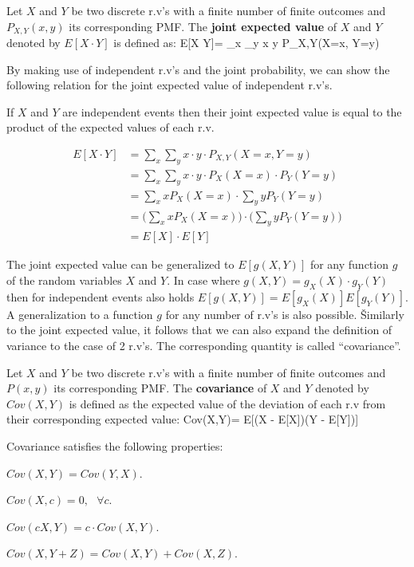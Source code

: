 Let $X$ and $Y$ be two discrete r.v's with a finite number of finite outcomes and $P_{X,Y}(x,y)$ its corresponding
PMF. The \textbf{joint expected value} of $X$ and $Y$ denoted by $E[X \cdot Y]$ is defined as:
\bse
E[X \cdot Y]= \sum _{x} \sum _{y} x \cdot y \cdot P_{X,Y}(X=x, Y=y)
\ese
\ed

By making use of independent r.v's and the joint probability, we can show the following relation for the joint
expected value of independent r.v's.

\bt[]
If $X$ and $Y$ are independent events then their joint expected value is equal to the product of the expected values
of each r.v.
\et

\bq
\begin{align*}
E[X \cdot Y] &= \sum _{x} \sum _{y} x \cdot y \cdot P_{X,Y}(X=x, Y=y) \\
&= \sum _{x} \sum _{y} x \cdot y \cdot P_{X}(X=x) \cdot P_{Y}(Y=y) \\
&= \sum _{x} x P_{X}(X=x) \cdot \sum _{y} y P_{Y}(Y=y) \\
&= \Big( \sum _{x} x P_{X}(X=x) \Big) \cdot \Big(\sum _{y} y P_{Y}(Y=y) \Big) \\
&= E[X] \cdot E[Y]
\end{align*}
\eq

The joint expected value can be generalized to $E[g(X,Y)]$ for any function $g$ of the random variables $X$ and $Y$.
In case where $g(X,Y) = g_{X}(X) \cdot g_{Y}(Y)$ then for independent events also holds $E[g(X,Y)] = E[g_{X}(X)]
E[g_{Y}(Y)]$. A generalization to a function $g$ for any number of r.v's is also possible. \v

Similarly to the joint expected value, it follows that we can also expand the definition of variance to the case of 2
r.v's. The corresponding quantity is called ``covariance''.

\bd[Covariance]
Let $X$ and $Y$ be two discrete r.v's with a finite number of finite outcomes and $P(x,y)$ its corresponding PMF. The
\textbf{covariance} of $X$ and $Y$ denoted by $Cov(X,Y)$ is defined as the expected value of the deviation of each r.v
from their corresponding expected value:
\bse
Cov(X,Y)= E[(X - E[X])(Y - E[Y])]
\ese
\ed

Covariance satisfies the following properties:
\bit
\item $Cov(X,Y) = Cov(Y,X)$.
\item $Cov(X, c) = 0, \:\:\: \forall c$.
\item $Cov(c X, Y) = c \cdot Cov(X, Y)$.
\item $Cov(X,Y+Z) = Cov(X,Y) + Cov(X,Z)$.
\eit

